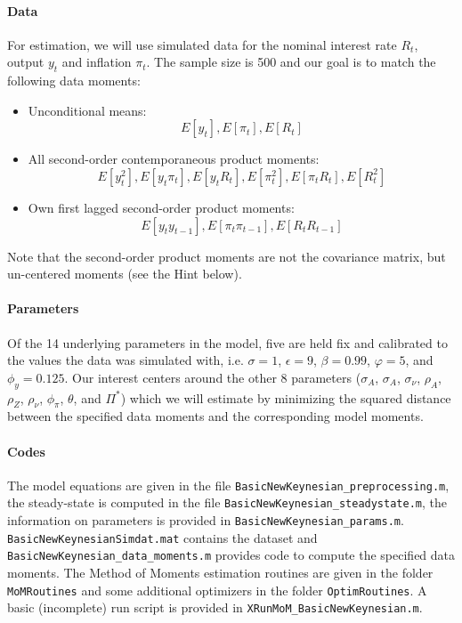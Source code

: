\documentclass{article}
\begin{document}
\paragraph{Data}
For estimation, we will use simulated data for the nominal interest rate $R_t$, output $y_t$ and inflation $\pi_t$. The sample size is 500 and our goal is to match the following data moments:
\begin{itemize}
	\item Unconditional means: $$E[y_t], E[\pi_t], E[R_t]$$
	\item All second-order contemporaneous product moments: $$E[y_t^2], E[y_t \pi_t], E[y_t R_t], E[\pi_t^2], E[\pi_t R_t], E[R_t^2]$$
	\item Own first lagged second-order product moments: $$E[y_t y_{t-1}], E[\pi_t \pi_{t-1}], E[R_t R_{t-1}]$$
\end{itemize}
Note that the second-order product moments are not the covariance matrix, but un-centered moments (see the Hint below).

\paragraph{Parameters}
Of the 14 underlying parameters in the model, five are held fix and calibrated to the values the data was simulated with, i.e. $\sigma=1$, $\epsilon=9$, $\beta=0.99$, $\varphi=5$, and $\phi_y=0.125$. Our interest centers around the other 8 parameters ($\sigma_A$, $\sigma_A$, $\sigma_\nu$, $\rho_A$, $\rho_Z$, $\rho_\nu$, $\phi_\pi$, $\theta$, and $\Pi^*$) which we will estimate by minimizing the squared distance between the specified data moments and the corresponding model moments.

\paragraph{Codes}
The model equations are given in the file \texttt{BasicNewKeynesian\_preprocessing.m}, the steady-state is computed in the file \texttt{BasicNewKeynesian\_steadystate.m}, the information on parameters is provided in \texttt{BasicNewKeynesian\_params.m}. \texttt{BasicNewKeynesianSimdat.mat} contains the dataset and \texttt{BasicNewKeynesian\_data\_moments.m} provides code to compute the specified data moments. The Method of Moments estimation routines are given in the folder \texttt{MoMRoutines} and some additional optimizers in the folder \texttt{OptimRoutines}. A basic (incomplete) run script is provided in \texttt{XRunMoM\_BasicNewKeynesian.m}.
\end{document}
